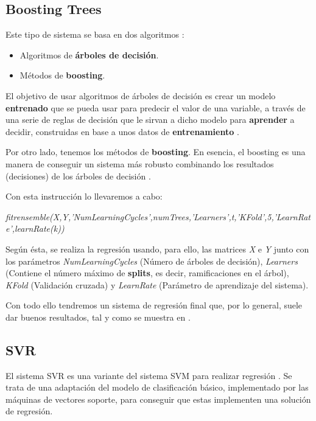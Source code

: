 \subsection{Boosting Trees}

Este tipo de sistema se basa en dos algoritmos \cite{boosting-trees}:

\begin{itemize}
\item Algoritmos de \textbf{árboles de decisión}.
\item Métodos de \textbf{boosting}.
\end{itemize}

El objetivo de usar algoritmos de árboles de decisión es crear un modelo \textbf{entrenado} que se pueda usar para predecir el valor de una variable, a través de una serie de reglas de decisión que le sirvan a dicho modelo para \textbf{aprender} a decidir, construidas en base a unos datos de \textbf{entrenamiento} \cite{decision-tree}.

Por otro lado, tenemos los métodos de \textbf{boosting}. En esencia, el boosting es una manera de conseguir un sistema más robusto combinando los resultados (decisiones) de los árboles de decisión \cite{boosting}.

Con esta instrucción lo llevaremos a cabo:

\begin{center}
\textit{fitrensemble(X,Y,'NumLearningCycles',numTrees,'Learners',t,'KFold',5,'LearnRate',learnRate(k))}
\end{center}

Según ésta, se realiza la regresión usando, para ello, las matrices \textit{X} e \textit{Y} junto con los parámetros \textit{NumLearningCycles} (Número de árboles de decisión), \textit{Learners} (Contiene el número máximo de \textbf{splits}, es decir, ramificaciones en el árbol), \textit{KFold} (Validación cruzada) y \textit{LearnRate} (Parámetro de aprendizaje del sistema)\cite{fitrensemble}.

Con todo ello tendremos un sistema de regresión final que, por lo general, suele dar buenos resultados, tal y como se muestra en \cite{isa2}.

\subsection{SVR}

El sistema \ac{SVR} es una variante del sistema \ac{SVM} para realizar regresión \cite{SVR}. Se trata de una adaptación del modelo de clasificación básico, implementado por las máquinas de vectores soporte, para conseguir que estas implementen una solución de regresión.

